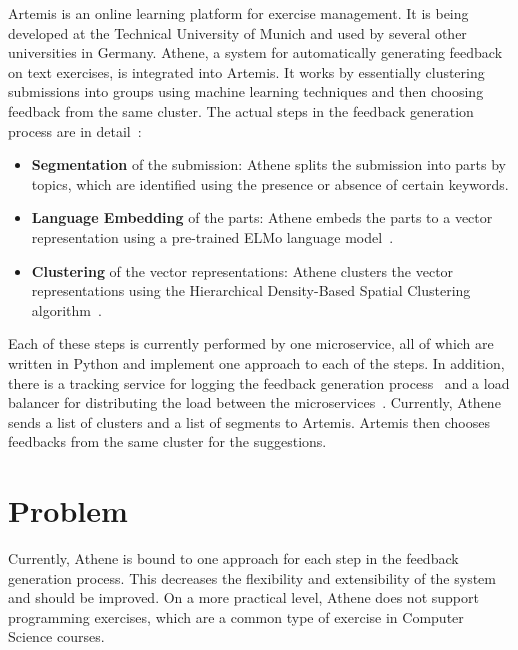 Artemis is an online learning platform for exercise management. It is being developed at the Technical University of Munich and used by several other universities in Germany. 
Athene, a system for automatically generating feedback on text exercises, is integrated into Artemis. It works by essentially clustering submissions into groups using machine learning techniques and then choosing feedback from the same cluster. The actual steps in the feedback generation process are in detail~\cite{cofee}:
\begin{itemize}
    \item \textbf{Segmentation} of the submission: Athene splits the submission into parts by topics, which are identified using the presence or absence of certain keywords.
    \item \textbf{Language Embedding} of the parts: Athene embeds the parts to a vector representation using a pre-trained ELMo language model~\cite{deepContextualizedWordRepresentations}.
    \item \textbf{Clustering} of the vector representations: Athene clusters the vector representations using the Hierarchical Density-Based Spatial Clustering algorithm~\cite{hdbsc}.
\end{itemize}

Each of these steps is currently performed by one microservice, all of which are written in Python and implement one approach to each of the steps.
In addition, there is a tracking service for logging the feedback generation process~\cite{atheneTracking} and a load balancer for distributing the load between the microservices~\cite{atheneLoadBalancer}.
Currently, Athene sends a list of clusters and a list of segments to Artemis. Artemis then chooses feedbacks from the same cluster for the suggestions.


\section*{Problem}

Currently, Athene is bound to one approach for each step in the feedback generation process. This decreases the flexibility and extensibility of the system and should be improved.
On a more practical level, Athene does not support programming exercises, which are a common type of exercise in Computer Science courses.

